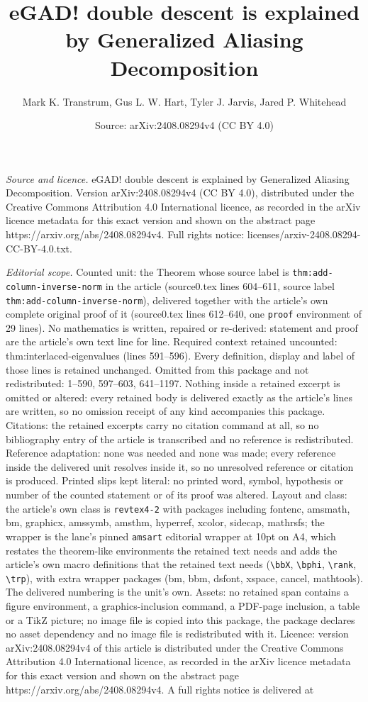 \documentclass[10pt,a4paper]{amsart}
\title[eGAD! double descent is explained by Generalized Aliasing De]{eGAD! double descent is explained by Generalized Aliasing Decomposition}
\author{Mark K. Transtrum, Gus L. W. Hart, Tyler J. Jarvis, Jared P. Whitehead}
\date{Source: arXiv:2408.08294v4 (CC BY 4.0)}
\begin{document}
\maketitle

\noindent\emph{Source and licence.} eGAD! double descent is explained by Generalized Aliasing Decomposition. Version arXiv:2408.08294v4 (CC BY 4.0), distributed under the Creative Commons Attribution 4.0 International licence, as recorded in the arXiv licence metadata for this exact version and shown on the abstract page https://arxiv.org/abs/2408.08294v4. Full rights notice: licenses/arxiv-2408.08294-CC-BY-4.0.txt.\par\smallskip

\noindent\textit{Editorial scope.} Counted unit: the Theorem whose source label is \texttt{thm:add-column-inverse-norm} in the article (source0.tex lines 604--611, source label \texttt{thm:add-column-inverse-norm}), delivered together with the article's own complete original proof of it (source0.tex lines 612--640, one \texttt{proof} environment of 29 lines). No mathematics is written, repaired or re-derived: statement and proof are the article's own text line for line. Required context retained uncounted: thm:interlaced-eigenvalues (lines 591--596). Every definition, display and label of those lines is retained unchanged. Omitted from this package and not redistributed: 1--590, 597--603, 641--1197. Nothing inside a retained excerpt is omitted or altered: every retained body is delivered exactly as the article's lines are written, so no omission receipt of any kind accompanies this package. Citations: the retained excerpts carry no citation command at all, so no bibliography entry of the article is transcribed and no reference is redistributed. Reference adaptation: none was needed and none was made; every reference inside the delivered unit resolves inside it, so no unresolved reference or citation is produced. Printed slips kept literal: no printed word, symbol, hypothesis or number of the counted statement or of its proof was altered. Layout and class: the article's own class is \texttt{revtex4-2} with packages including fontenc, amsmath, bm, graphicx, amssymb, amsthm, hyperref, xcolor, sidecap, mathrsfs; the wrapper is the lane's pinned \texttt{amsart} editorial wrapper at 10pt on A4, which restates the theorem-like environments the retained text needs and adds the article's own macro definitions that the retained text needs (\texttt{\textbackslash bbX}, \texttt{\textbackslash bphi}, \texttt{\textbackslash rank}, \texttt{\textbackslash trp}), with extra wrapper packages (bm, bbm, dsfont, xspace, cancel, mathtools). The delivered numbering is the unit's own. Assets: no retained span contains a figure environment, a graphics-inclusion command, a PDF-page inclusion, a table or a TikZ picture; no image file is copied into this package, the package declares no asset dependency and no image file is redistributed with it. Licence: version arXiv:2408.08294v4 of this article is distributed under the Creative Commons Attribution 4.0 International licence, as recorded in the arXiv licence metadata for this exact version and shown on the abstract page https://arxiv.org/abs/2408.08294v4. A full rights notice is delivered at 
\end{document}
